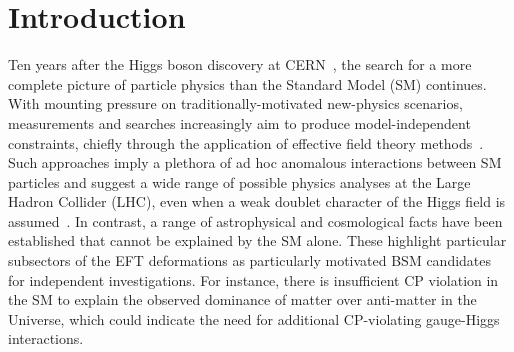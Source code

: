 \documentclass[twocolumn,preprintnumbers,superscriptaddress,nofootinbib,aps,prd,floatfix]{revtex4}
\begin{document}
\author{Noah Clarke Hall} 
\author{Isaac Criddle} 
\author{Archie Crossland}
\author{Christoph Englert} 
\author{Patrick Forbes} 
\author{Robert Hankache} 
\author{Andrew D. Pilkington} 



\maketitle

\section{Introduction}
\label{sec:intro}
Ten years after the Higgs boson discovery at \hbox{CERN~\cite{ATLAS:2012yve,CMS:2012qbp}}, the search for a more complete picture of particle physics than the Standard Model (SM) continues. With mounting pressure on traditionally-motivated new-physics scenarios, measurements and searches increasingly aim to produce model-independent constraints, chiefly through the application of effective field theory methods~\cite{Weinberg:1978kz}. Such approaches imply a plethora of ad hoc anomalous interactions between SM particles and suggest a wide range of possible physics analyses at the Large Hadron Collider (LHC), even when a weak doublet character of the Higgs field is assumed~\cite{Grzadkowski:2010es,Baak:2014ora}. In contrast, a range of astrophysical and cosmological facts have been established that cannot be explained by the SM alone. These highlight particular subsectors of the EFT deformations as particularly motivated BSM candidates for independent investigations. For instance, there is insufficient CP violation in the SM to explain the observed dominance of matter over anti-matter in the Universe, which could indicate the need for additional CP-violating gauge-Higgs interactions. 
\end{document}
